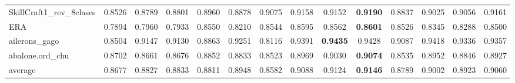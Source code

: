 \begin{tabular}{lccccccccccccc}
SkillCraft1_rev_8clases & 0.8526 & 0.8789 & 0.8801 & 0.8960 & 0.8878 & 0.9075 & 0.9158 & 0.9152 & \textbf{0.9190} & 0.8837 & 0.9025 & 0.9056 & 0.9161 \\
ERA & 0.7894 & 0.7960 & 0.7933 & 0.8550 & 0.8210 & 0.8544 & 0.8595 & 0.8562 & \textbf{0.8601} & 0.8526 & 0.8345 & 0.8288 & 0.8500 \\
ailerons_gago & 0.8504 & 0.9147 & 0.9130 & 0.8863 & 0.9251 & 0.8116 & 0.9391 & \textbf{0.9435} & 0.9428 & 0.9087 & 0.9418 & 0.9336 & 0.9357 \\
abalone.ord_chu & 0.8702 & 0.8661 & 0.8676 & 0.8852 & 0.8833 & 0.8523 & 0.8969 & 0.9030 & \textbf{0.9074} & 0.8535 & 0.8952 & 0.8846 & 0.8927 \\
average & 0.8677 & 0.8827 & 0.8833 & 0.8811 & 0.8948 & 0.8582 & 0.9088 & 0.9124 & \textbf{0.9146} & 0.8789 & 0.9002 & 0.8923 & 0.9060 \\
\bottomrule
\end{tabular}
